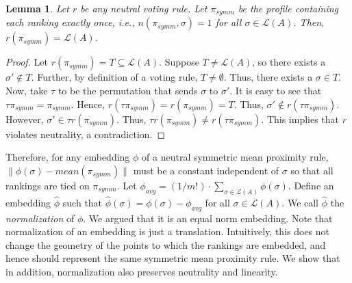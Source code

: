 \documentclass[10pt,letterpaper]{article}
\newcommand{\calL}{{\mathcal{L}}}
\newcommand{\rank}{{\calL(A)}}
\newtheorem{lemma}{Lemma}
\begin{document}
\begin{lemma}
Let $r$ be any neutral voting rule. Let $\pi_{symm}$ be the profile containing each ranking exactly once, i.e., $n(\pi_{symm},\sigma) = 1$ for all $\sigma \in \rank$. Then, $r(\pi_{symm}) = \rank$. 
\label{lem:average-profile}
\end{lemma}
\begin{proof}
Let $r(\pi_{symm}) = T \subseteq \rank$. Suppose $T \neq \rank$, so there exists a $\sigma' \notin T$. Further, by definition of a voting rule, $T \neq \emptyset$. Thus, there exists a $\sigma \in T$. Now, take $\tau$ to be the permutation that sends $\sigma$ to $\sigma'$. %
It is easy to see that $\tau \pi_{symm} = \pi_{symm}$. Hence, $r(\tau \pi_{symm}) = r(\pi_{symm}) = T$. Thus, $\sigma' \notin r(\tau \pi_{symm})$. However, $\sigma' \in \tau r(\pi_{symm})$. Thus, $\tau r(\pi_{symm}) \neq r(\tau \pi_{symm})$. This implies that $r$ violates neutrality, a contradiction. 
\end{proof}

Therefore, for any embedding $\phi$ of a neutral symmetric mean proximity rule, $\|\phi(\sigma)-mean(\pi_{symm})\|$ must be a constant independent of $\sigma$ so that all rankings are tied on $\pi_{symm}$. Let $\phi_{avg} = (1/{m!}) \cdot \sum_{\sigma \in \rank} \phi(\sigma)$. Define an embedding $\hat{\phi}$  such that $\hat{\phi}(\sigma) = \phi(\sigma) - \phi_{avg}$ for all $\sigma \in \rank$. We call $\hat{\phi}$ the \emph{normalization} of $\phi$. We argued that it is an equal norm embedding. Note that normalization of an embedding is just a translation. Intuitively, this does not change the geometry of the points to which the rankings are embedded, and hence should represent the same symmetric mean proximity rule. We show that in addition, normalization also preserves neutrality and linearity. 

\end{document}
